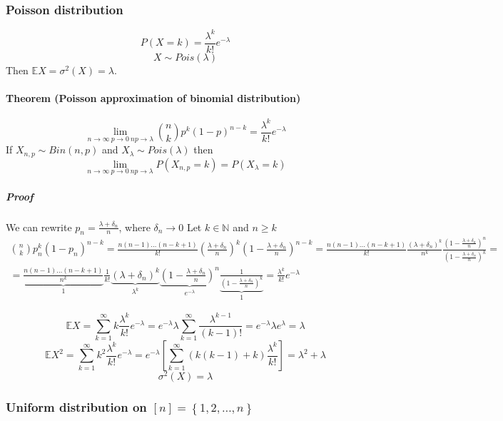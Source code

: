 \subsubsection{Poisson distribution}
$$P(X=k) = \frac{\lambda^k}{k!} e^{-\lambda}$$
$$X \sim Pois(\lambda)$$
Then $\mathbb{E} X = \sigma^2(X) = \lambda$.
\paragraph{Theorem (Poisson approximation of binomial distribution)}
$$\lim_{n \to \infty \: p \to 0 \: np \to \lambda} \binom{n}{k}p^k (1-p)^{n-k} = \frac{\lambda^k}{k!} e^{-\lambda}$$
If $X_{n,p} \sim Bin(n,p) $ and $X_\lambda \sim Pois(\lambda)$ then
$$\lim_{n \to \infty \: p \to 0 \: np \to \lambda} P(X_{n,p}=k)  = P(X_\lambda = k) $$

\subparagraph{Proof}
We can rewrite $p_n = \frac{\lambda + \delta_n}{n}$, where $\delta_n \to 0$
Let $k \in \mathbb{N}$ and $n\geq k$
\begin{align*}
\binom{n}{k}p_n^k (1-p_n)^{n-k} = \frac{n(n-1)\dots (n-k+1)}{k!} \left(\frac{\lambda + \delta_n}{n}\right)^k \left(1-\frac{\lambda + \delta_n}{n}\right)^{n-k} = \frac{n(n-1)\dots (n-k+1)}{k!} \frac{ \left(\lambda + \delta_n\right)^k }{n^k } \frac{\left(1-\frac{\lambda + \delta_n}{n}\right)^{n}}{\left(1-\frac{\lambda + \delta_n}{n}\right)^{k}} =\\=\underbrace{ \frac{n(n-1)\dots (n-k+1)}{n^k}  }_{1}\frac{1}{k!}\underbrace{\left(\lambda + \delta_n\right)^k}_{\lambda^k}\underbrace{ \left(1-\frac{\lambda + \delta_n}{n}\right)^{n}}_{e^{-\lambda}} \underbrace{ \frac{1}{\left(1-\frac{\lambda + \delta_n}{n}\right)^{k}}}_{1} = \frac{\lambda^k}{k!} e^{-\lambda}	
\end{align*}

$$\mathbb{E}X = \sum_{k=1}^\infty k \frac{\lambda^k}{k!} e^{-\lambda}  = e^{-\lambda}\lambda \sum_{k=1}^\infty  \frac{\lambda^{k-1}}{(k-1)!} =e^{-\lambda} \lambda e^{\lambda} = \lambda  $$
$$\mathbb{E}X^2 = \sum_{k=1}^\infty k^2 \frac{\lambda^k}{k!} e^{-\lambda} = e^{-\lambda}\left[\sum_{k=1}^\infty \left(k(k-1) + k\right) \frac{\lambda^k}{k!} \right] = \lambda^2 + \lambda$$
$$\sigma^2(X) = \lambda$$

\subsubsection{Uniform distribution on $[n] = \left\{ 1,2,\dots, n \right\}$}
